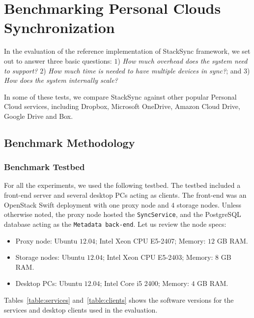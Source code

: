 \chapter{Benchmarking Personal Clouds Synchronization}

In the evaluation of the reference implementation of StackSync framework, we set out to answer three basic questions: 
$1$) \textit{How much overhead does the system need to support?} $2$) \textit{How much time is needed to have multiple devices in sync?}; and 
$3$) \textit{How does the system internally scale?}

In some of these tests, we compare StackSync against other popular Personal Cloud services, including Dropbox, Microsoft OneDrive, Amazon Cloud Drive, Google Drive and Box.

\section{Benchmark Methodology}

\subsection{Benchmark Testbed}

For all the experiments, we used the following testbed. The testbed included a front-end server and several desktop 
PCs acting as clients. The front-end was an OpenStack Swift deployment with one proxy node and $4$ storage nodes.  
Unless otherwise noted, the proxy node hosted the \texttt{SyncService}, and the PostgreSQL database acting as the \texttt{Metadata back-end}. Let us review the node specs:
\begin{itemize}
\item Proxy node: Ubuntu $12.04$; Intel Xeon CPU E5-2407; Memory: $12$ GB RAM.
\item Storage nodes: Ubuntu $12.04$;  Intel Xeon CPU E5-2403; Memory: $8$ GB RAM.
\item Desktop PCs: Ubuntu $12.04$; Intel Core i5 2400; Memory: $4$ GB RAM.
\end{itemize}

Tables~\ref{table:services} and~\ref{table:clients} shows the software versions for the services and desktop clients used in the evaluation.

